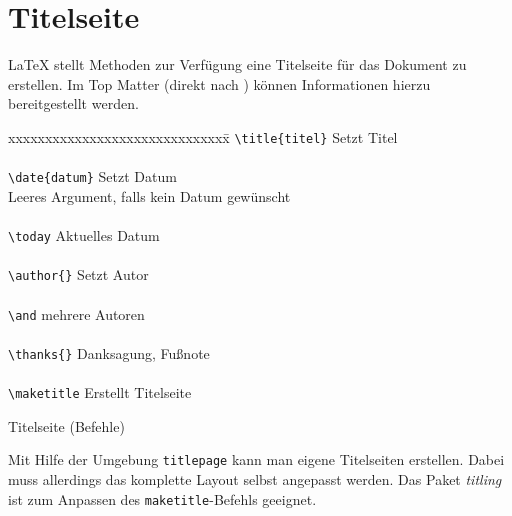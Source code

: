 \chapter{Titelseite}
\LaTeX{} stellt Methoden zur Verfügung eine Titelseite für das Dokument zu erstellen. Im Top Matter (direkt nach \verb==) können Informationen hierzu bereitgestellt werden.
\begin{table}[H]
\begin{tabbing}
xxxxxxxxxxxxxxxxxxxxxxxxxxxxxx\=\kill
\verb=\title{titel}=					\>Setzt Titel\\
\\
\verb=\date{datum}=					\>Setzt Datum\\
								\>Leeres Argument, falls kein Datum gewünscht\\
\\
\verb=\today=						\>Aktuelles Datum\\
\\
\verb=\author{}=						\>Setzt Autor\\
\\
\verb=\and=						\>mehrere Autoren\\
\\
\verb=\thanks{}=						\>Danksagung, Fußnote\\
\\
\verb=\maketitle=					\>Erstellt Titelseite\\
\end{tabbing}
\caption{Titelseite (Befehle)}
\end{table}
Mit Hilfe der Umgebung \texttt{titlepage} kann man eigene Titelseiten erstellen. Dabei muss allerdings das komplette Layout selbst angepasst werden. Das Paket \textsl{titling} ist zum Anpassen des \texttt{maketitle}-Befehls geeignet.